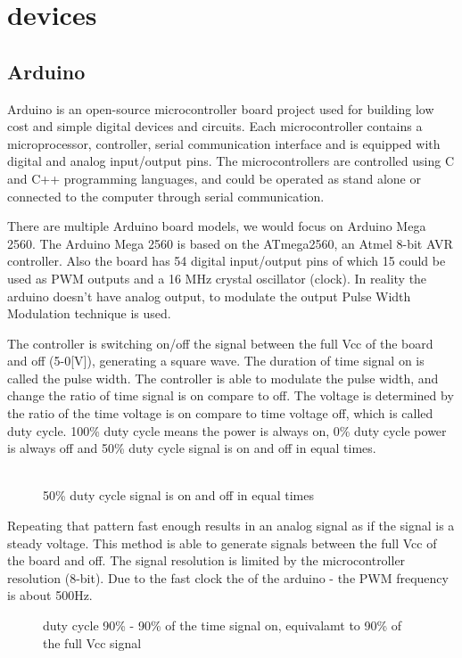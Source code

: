 \documentclass[\main/master.tex]{subfiles}
\begin{document}
\chapter{devices}\label{chp:3}
\doublespacing

\section{Arduino}
Arduino is an open-source microcontroller board project used for building low cost and simple digital devices and circuits. Each microcontroller contains a microprocessor, controller, serial communication interface and is equipped with digital and analog input/output pins. The microcontrollers are controlled using C and C++ programming languages, and could be operated as stand alone or connected to the computer through serial communication. 
\par
There are multiple Arduino board models, we would focus on Arduino Mega 2560. The Arduino Mega 2560 is based on the ATmega2560, an Atmel 8-bit AVR controller. Also the board has 54 digital input/output pins of which 15 could be used as PWM outputs and a 16 MHz crystal oscillator (clock). In reality the arduino doesn't have analog output, to modulate the output Pulse Width Modulation technique is used.
\par
The controller is switching on/off the signal between the full Vcc of the board and off (5-0[V]), generating a square wave. The duration of time signal on is called the pulse width. The controller is able to modulate the pulse width, and change the ratio of time signal is on compare to off. The voltage is determined by the ratio of the time voltage is on compare to time voltage off, which is called duty cycle. 100\% duty cycle means the power is always on, 0\% duty cycle power is always off and 50\% duty cycle signal is on and off in equal times. 
\\
\\
\par

\begin{figure}[htbp]
	\centering
	\caption[duty cycle 50\%]{50\% duty cycle signal is on and off in equal times}
	\label{fig:duty50}
\end{figure}
Repeating that pattern fast enough results in an analog signal as if the signal is a steady voltage. This method is able to generate signals between the full Vcc of the board and off. The signal resolution is limited by the microcontroller resolution (8-bit). Due to the fast clock the of the arduino - the PWM frequency is about 500Hz.
\par
\begin{figure}[htbp]
	\centering
	\caption[duty cycle 90\%]{duty cycle 90\%  - 90\% of the time signal on, equivalamt to 90\% of the full Vcc signal}
	\label{fig:duty90}
\end{figure}
\end{document}
